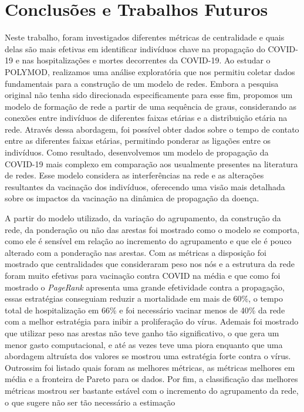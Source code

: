 \chapter{Conclusões e Trabalhos Futuros}
\label{chap:conclusoes-e-trabalhos-futuros}

Neste trabalho, foram investigados diferentes métricas de centralidade e quais delas são 
mais
efetivas em identificar indivíduos chave na propagação do COVID-19
e nas hospitalizações e mortes decorrentes da COVID-19.
Ao estudar o POLYMOD, realizamos uma análise exploratória que nos permitiu coletar dados fundamentais para a construção de um modelo de redes. Embora a pesquisa original não tenha sido direcionada especificamente para esse fim, propomos um modelo de formação de rede a partir de uma sequência de graus, considerando as conexões entre indivíduos de diferentes faixas etárias e a distribuição etária na rede. Através dessa abordagem, foi possível obter dados sobre o tempo de contato entre as diferentes faixas etárias, permitindo ponderar as ligações entre os indivíduos. Como resultado, desenvolvemos um modelo de propagação da COVID-19 
mais complexo em comparação aos usualmente presentes na literatura de redes. Esse modelo considera as interferências na rede e as alterações resultantes da vacinação dos indivíduos, oferecendo uma visão mais detalhada sobre os impactos da vacinação na dinâmica de propagação da doença.

A partir do modelo utilizado, da variação do agrupamento, da construção da rede, da ponderação ou não das arestas foi mostrado como o modelo se comporta, como ele é sensível em relação ao incremento 
do agrupamento
e que ele é pouco alterado com a ponderação nas arestas. Com as métricas a disposição foi mostrado que centralidades que consideraram peso nos nós e a estrutura da rede foram muito efetivas para vacinação contra COVID na média e que como foi mostrado o \textit{PageRank} apresenta uma grande efetividade contra a propagação, essas estratégias conseguiam reduzir a mortalidade em 
mais de
60\%, 
o tempo total de hospitalização em 66\% 
e foi necessário vacinar menos de 40\% da rede com a melhor estratégia para inibir a proliferação do vírus. Ademais foi mostrado que utilizar peso nas arestas não teve ganho tão significativo, o que gera um menor gasto computacional, e até as vezes teve uma piora enquanto que uma abordagem altruísta dos valores se mostrou uma estratégia forte contra o vírus. Outrossim foi listado quais foram as melhores métricas, as métricas melhores em média e a fronteira de Pareto para os dados. Por fim, a classificação das melhores métricas mostrou ser bastante estável com o incremento do agrupamento da rede, o que 
sugere não ser tão necessário a estimação 


